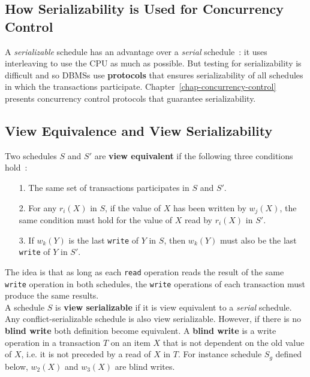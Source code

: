 \subsection{How Serializability is Used for Concurrency Control}
A \textit{serializable} schedule has an advantage over a \textit{serial} schedule~: it uses interleaving to use the CPU as much as possible. But testing for serializability is difficult and so DBMSs use \textbf{protocols} that ensures serializability of all schedules in which the transactions participate. Chapter~\ref{chap-concurrency-control} presents concurrency control protocols that guarantee serializability.


\subsection{View Equivalence and View Serializability}
Two schedules $S$ and $S'$ are \textbf{view equivalent} if the following three conditions hold~:

\begin{itemize}
    \item[1.] The same set of transactions participates in $S$ and $S'$.
    \item[2.] For any $r_i(X)$ in $S$, if the value of $X$ has been written by $w_j(X)$, the same condition must hold for the value of $X$ read by $r_i(X)$ in $S'$.
    \item[3.] If $w_k(Y)$ is the last \texttt{write} of $Y$ in $S$, then $w_k(Y)$ must also be the last \texttt{write} of $Y$ in $S'$.
\end{itemize}

The idea is that as long as each \texttt{read} operation reads the result of the same \texttt{write} operation in both schedules, the \texttt{write} operations of each transaction must produce the same results. \\

A schedule $S$ is \textbf{view serializable} if it is view equivalent to a \textit{serial} schedule. \\

Any conflict-serializable schedule is also view serializable. However, if there is no \textbf{blind write} both definition become equivalent. A \textbf{blind write} is a write operation in a transaction $T$ on an item $X$ that is not dependent on the old value of $X$, i.e. it is not preceded by a read of $X$ in $T$. For instance schedule $S_g$ defined below, $w_2(X)$ and $w_3(X)$ are blind writes.

